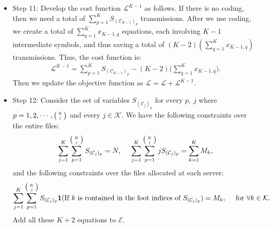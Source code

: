 \documentclass[conference]{IEEEtran}
\begin{document}
\begin{itemize}
\item{Step 11:} Develop the cost function $\mathcal{L}^{K-1}$ as follows. If there is no coding, then we need a total of $\sum_{p=1}^K S_{(\mathcal{C}_{K-1})_p}$ transmissions. After we use coding,  we create a total of $\sum_{q=1}^K x_{K-1,q}$ equations, each involving $K-1$ intermediate symbols, and thus saving a total of $(K-2)(\sum_{q=1}^K x_{K-1,q})$ transmissions. Thus, the cost function is:
\begin{eqnarray*}
\mathcal{L}^{K-1}=\sum_{p=1}^K S_{(\mathcal{C}_{K-1})_p}-(K-2)\bigg(\sum_{q=1}^K x_{K-1,q}\bigg).
\end{eqnarray*}
Then we update the objective function as $\mathcal{L}=\mathcal{L}+\mathcal{L}^{K-1}$.

\item{Step 12:} Consider the set of variables $S_{(\mathcal{C}_j)_p}$ for every $p,~j$ where $p=1,2,\cdots,\big(\!\!\begin{tiny}\begin{array}{c}K\\j\end{array}\end{tiny}\!\!\big)$ and every $j\in\mathcal{K}$. We have the following constraints over the entire files:
\begin{eqnarray*}
\sum_{j=1}^K\sum_{p=1}^{\big(\!\!\begin{tiny}\begin{array}{c}K\\j\end{array}\end{tiny}\!\!\big)}S_{(\mathcal{C}_j)_p}=N,~~~~
\sum_{j=1}^K\sum_{p=1}^{\big(\!\!\begin{tiny}\begin{array}{c}K\\j\end{array}\end{tiny}\!\!\big)}jS_{(\mathcal{C}_j)_p}=\sum_{k=1}^K{M_k},
\end{eqnarray*}
and the following constraints over the files allocated at each server:
\begin{eqnarray*}
\sum_{j=1}^K\sum_{p=1}^{\big(\!\!\begin{tiny}\begin{array}{c}K\\j\end{array}\end{tiny}\!\!\big)}S_{(\mathcal{C}_j)_p}{\bf 1}(\textrm{If}~k~\textrm{is contained in the foot indices of} ~S_{(\mathcal{C}_j)_p})=M_k,~~~~\textrm{for}~\forall k\in\mathcal{K}.
\end{eqnarray*}
Add all these $K+2$ equations to $\mathcal{E}$.


\end{itemize}
\end{document}
